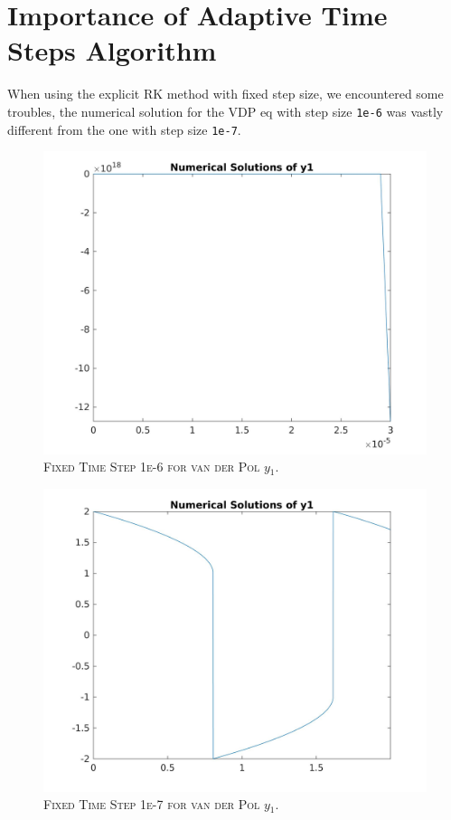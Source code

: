 \documentclass[a4paper,oneside]{book}
\numberwithin{equation}{chapter}
\begin{document}
\section{Importance of Adaptive Time Steps Algorithm}
When using the explicit RK method with fixed step size, we encountered some troubles, the numerical solution for the VDP eq with step size \texttt{1e-6} was vastly different from the one with step size \texttt{1e-7}. 
\begin{figure}[H]
\centering 
\includegraphics[scale=0.18]{fts_vdp_y1_1e-6_nl}
\caption{\textsc{Fixed Time Step 1e-6 for van der Pol $y_1$.}}
\end{figure}
\begin{figure}[H]
\centering 
\includegraphics[scale=0.18]{fts_vdp_y1_1e-7_nl}
\caption{\textsc{Fixed Time Step 1e-7 for van der Pol $y_1$.}}
\end{figure}
\end{document}
